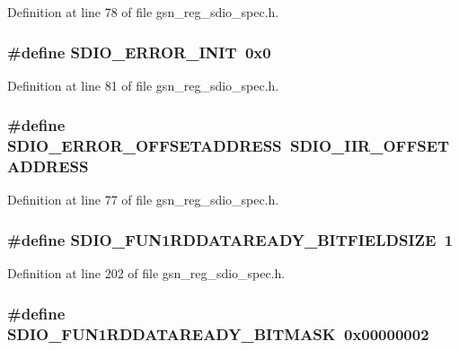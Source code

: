 Definition at line 78 of file gsn\_\-reg\_\-sdio\_\-spec.h.

\hypertarget{a00571_ac692faa1eebe96f27cbcd51c4f0e364b}{
\subsubsection[{SDIO\_\-ERROR\_\-INIT}]{\setlength{\rightskip}{0pt plus 5cm}\#define SDIO\_\-ERROR\_\-INIT~0x0}}
\label{a00571_ac692faa1eebe96f27cbcd51c4f0e364b}


Definition at line 81 of file gsn\_\-reg\_\-sdio\_\-spec.h.

\hypertarget{a00571_aef95221243006f36e9532d4625acbf93}{
\subsubsection[{SDIO\_\-ERROR\_\-OFFSETADDRESS}]{\setlength{\rightskip}{0pt plus 5cm}\#define SDIO\_\-ERROR\_\-OFFSETADDRESS~SDIO\_\-IIR\_\-OFFSETADDRESS}}
\label{a00571_aef95221243006f36e9532d4625acbf93}


Definition at line 77 of file gsn\_\-reg\_\-sdio\_\-spec.h.

\hypertarget{a00571_ab8dd8e85c30f2039b0435876d740db90}{
\subsubsection[{SDIO\_\-FUN1RDDATAREADY\_\-BITFIELDSIZE}]{\setlength{\rightskip}{0pt plus 5cm}\#define SDIO\_\-FUN1RDDATAREADY\_\-BITFIELDSIZE~1}}
\label{a00571_ab8dd8e85c30f2039b0435876d740db90}


Definition at line 202 of file gsn\_\-reg\_\-sdio\_\-spec.h.

\hypertarget{a00571_a1fa40fc0a57ae43b5dbc8a4358d87b78}{
\subsubsection[{SDIO\_\-FUN1RDDATAREADY\_\-BITMASK}]{\setlength{\rightskip}{0pt plus 5cm}\#define SDIO\_\-FUN1RDDATAREADY\_\-BITMASK~0x00000002}}
\label{a00571_a1fa40fc0a57ae43b5dbc8a4358d87b78}


